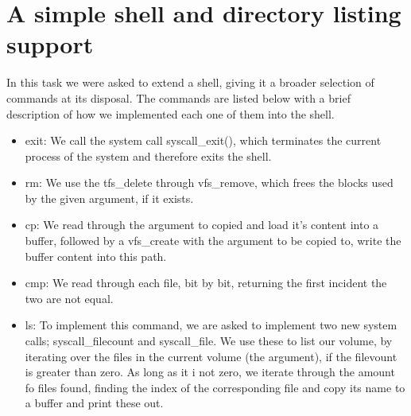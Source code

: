 \documentclass[12pt,a4paper,danish]{article}
\begin{document}
\section{A simple shell and directory listing support}
In this task we were asked to extend a shell, giving it a broader selection of commands at its disposal. The commands are listed below with a brief description of how we implemented each one of them into the shell. 
\begin{itemize}
\item exit: We call the system call syscall\_exit(), which terminates the current process of the system and therefore exits the shell.
\item rm: We use the tfs\_delete through vfs\_remove, which  frees the blocks used by the given argument, if it exists.
\item cp: We read through the argument to copied and load it's content into a buffer, followed by a vfs\_create with the argument to be copied to, write the buffer content into  this path.
\item cmp: We read through each file, bit by bit, returning the first incident the two are not equal.
\item ls: To implement this command, we are asked to implement two new system calls; syscall\_filecount and syscall\_file. We use these to list our volume, by iterating over the files in the current volume (the argument), if the filevount is greater than zero. As long as it i not zero, we iterate through the amount fo files found, finding the index of the corresponding file and copy its name to a buffer and print these out.
\end{itemize}
\end{document}
